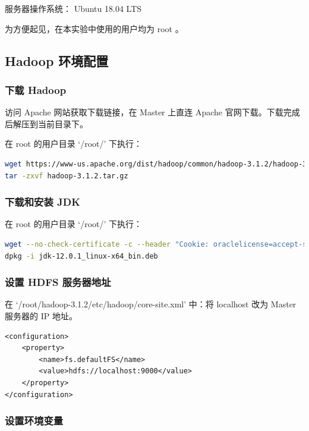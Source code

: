 \documentclass{article}
\begin{document}
服务器操作系统： Ubuntu 18.04 LTS

为方便起见，在本实验中使用的用户均为 root 。

\subsection{Hadoop 环境配置}

\subsubsection{下载 Hadoop}

访问 Apache 网站获取下载链接，在 Master 上直连 Apache 官网下载。下载完成后解压到当前目录下。

在 root 的用户目录 `/root/' 下执行：

\begin{lstlisting}[language=bash]
wget https://www-us.apache.org/dist/hadoop/common/hadoop-3.1.2/hadoop-3.1.2.tar.gz
tar -zxvf hadoop-3.1.2.tar.gz
\end{lstlisting}

\subsubsection{下载和安装 JDK}

在 root 的用户目录 `/root/' 下执行：

\begin{lstlisting}[language=bash]
wget --no-check-certificate -c --header "Cookie: oraclelicense=accept-securebackup-cookie"  https://download.oracle.com/otn-pub/java/jdk/12.0.1+12/69cfe15208a647278a19ef0990eea691/jdk-12.0.1_linux-x64_bin.deb
dpkg -i jdk-12.0.1_linux-x64_bin.deb
\end{lstlisting}

\subsubsection{设置 HDFS 服务器地址}

在 `/root/hadoop-3.1.2/etc/hadoop/core-site.xml' 中：将 localhost 改为 Master 服务器的 IP 地址。

\begin{lstlisting}
<configuration>
    <property>
        <name>fs.defaultFS</name>
        <value>hdfs://localhost:9000</value>
    </property>
</configuration>
\end{lstlisting}

\subsubsection{设置环境变量}
\end{document}
